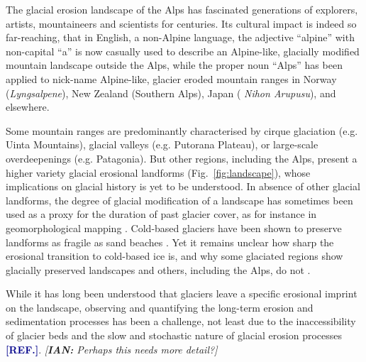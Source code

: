 \documentclass[utf8]{article}
\newcommand{\aref}[0]{\textcolor{darkblue}{\textbf{[REF.]}}}
\newcommand{\ian}[1]{\textcolor{darkbrown}{\emph{[\textbf{IAN:} #1]}}}
\begin{document}
    The glacial erosion landscape of the Alps has fascinated generations of
    explorers, artists, mountaineers and scientists for centuries. Its cultural
    impact is indeed so far-reaching, that in English, a non-Alpine language,
    the adjective ``alpine'' with non-capital ``a'' is now casually used to
    describe an Alpine-like, glacially modified mountain landscape outside the
    Alps, while the proper noun ``Alps'' has been applied to nick-name
    Alpine-like, glacier eroded mountain ranges in Norway (\emph{Lyngsalpene}),
    New Zealand (Southern Alps), Japan
    (\emph{%
    Nihon Arupusu}), and elsewhere.

    Some mountain ranges are predominantly characterised by cirque glaciation
    (e.g. Uinta Mountains), glacial valleys (e.g. Putorana Plateau), or
    large-scale overdeepenings (e.g. Patagonia). But other regions, including
    the Alps, present a higher variety glacial erosional landforms
    (Fig.~\ref{fig:landscape}), whose implications on glacial history is yet to
    be understood.
    In absence of other glacial landforms, the degree of glacial modification
    of a landscape has sometimes been used as a proxy for the duration of past
    glacier cover, as for instance in geomorphological mapping
    \citep[e.g.][]{Margold.etal.2011, Fu.etal.2012}. Cold-based glaciers have
    been shown to preserve landforms as fragile as sand beaches
    \citep{Kleman.1994}. Yet it remains unclear how sharp the erosional
    transition to cold-based ice is, and why some glaciated regions show
    glacially preserved landscapes and others, including the Alps, do not
    \citep{Wirsig.etal.2016, Seguinot.etal.2018}.

    While it has long been understood that glaciers leave a specific erosional
    imprint on the landscape, observing and quantifying the long-term erosion
    and sedimentation processes has been a challenge, not least due to the
    inaccessibility of glacier beds and the slow and stochastic nature of
    glacial erosion processes \aref. \ian{Perhaps this needs more detail?}
\end{document}
